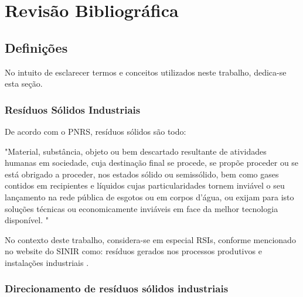 \chapter{Revisão Bibliográfica}\label{cap:revisaobibliografica}

\section{Definições}

No intuito de esclarecer termos e conceitos utilizados neste trabalho, dedica-se esta seção.

\subsection{Resíduos Sólidos Industriais}

De acordo com o \gls{PNRS}, resíduos sólidos são todo:

\begin{citacao}
	"Material, substância, objeto ou bem descartado resultante de atividades humanas em sociedade, cuja destinação final se procede, se propõe proceder ou se está obrigado a proceder, nos estados sólido ou semissólido, bem como gases contidos em recipientes e líquidos cujas particularidades tornem inviável o seu lançamento na rede pública de esgotos ou em corpos d’água, ou exijam para isto soluções técnicas ou economicamente inviáveis em face da melhor tecnologia disponível. \cite[Art. 3º, ítem XVI]{brasil_lei_nodate}"		
\end{citacao}

No contexto deste trabalho, considera-se em especial \gls{RSI}s, conforme mencionado no website do \gls{SINIR} como: resíduos gerados nos processos produtivos e instalações industriais \cite{sinir_sinir_nodate}.

\subsection{Direcionamento de resíduos sólidos industriais}

